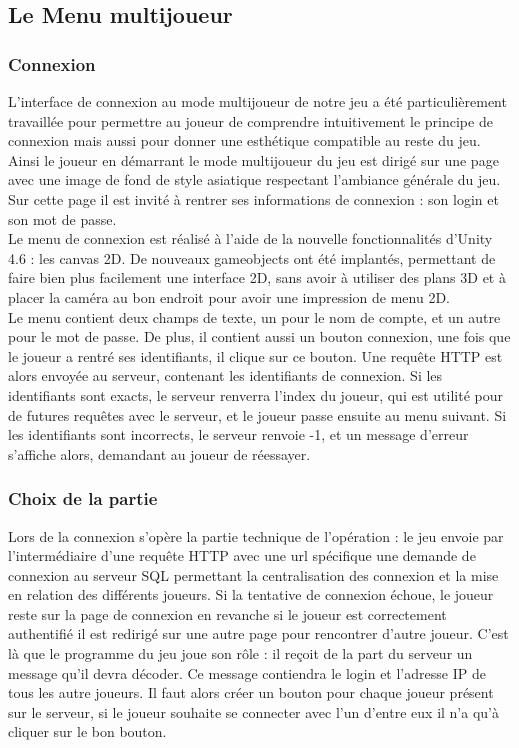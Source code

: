 \documentclass[12pt]{article}
\begin{document}
\subsection{Le Menu multijoueur}

\subsubsection{Connexion}

L’interface de connexion au mode multijoueur de notre jeu a été particulièrement travaillée pour permettre au joueur de comprendre intuitivement le principe de connexion mais aussi pour donner une esthétique compatible au reste du jeu. Ainsi le joueur en démarrant le mode multijoueur du jeu est dirigé sur une page avec une image de fond de style asiatique respectant l’ambiance générale du jeu. Sur cette page il est invité à rentrer ses informations de connexion : son login et son mot de passe. \\

Le menu de connexion est réalisé à l'aide de la nouvelle fonctionnalités d'Unity 4.6 : les canvas 2D. De nouveaux gameobjects ont été implantés, permettant de faire bien plus facilement une interface 2D, sans avoir à utiliser des plans 3D et à placer la caméra au bon endroit pour avoir une impression de menu 2D.\\
Le menu contient deux champs de texte, un pour le nom de compte, et un autre pour le mot de passe. De plus, il contient aussi un bouton connexion, une fois que le joueur a rentré ses identifiants, il clique sur ce bouton. Une requête HTTP est alors envoyée au serveur, contenant les identifiants de connexion. Si les identifiants sont exacts, le serveur renverra l'index du joueur, qui est utilité pour de futures requêtes avec le serveur, et le joueur passe ensuite au menu suivant. Si les identifiants sont incorrects, le serveur renvoie -1, et un message d'erreur s'affiche alors, demandant au joueur de réessayer.\\


\subsubsection{Choix de la partie}

Lors de la connexion s’opère la partie technique de l’opération : le jeu envoie par l’intermédiaire d’une requête HTTP avec une url spécifique une demande de connexion au serveur SQL permettant la centralisation des connexion et la mise en relation des différents joueurs. Si la tentative de connexion échoue, le joueur reste sur la page de connexion en revanche si le joueur est correctement authentifié il est redirigé sur une autre page pour rencontrer d’autre joueur. C’est là que le programme du jeu joue son rôle : il reçoit de la part du serveur un message qu’il devra décoder. Ce message contiendra le login et l’adresse IP de tous les autre joueurs. Il faut alors créer un bouton pour chaque joueur présent sur le serveur, si le joueur souhaite se connecter avec l’un d’entre eux il n’a qu’à cliquer sur le bon bouton.
\end{document}
